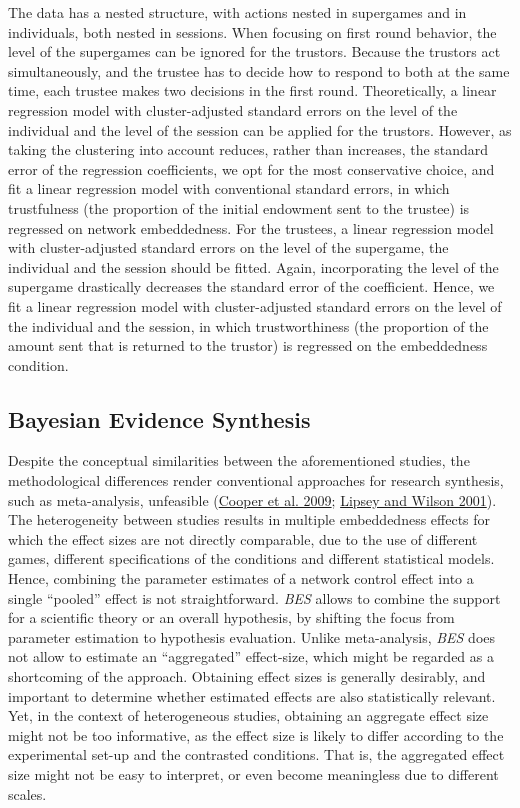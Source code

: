 \documentclass[
  11pt,
]{article}
\begin{document}
The data has a nested structure, with actions nested in supergames and in individuals, both nested in sessions.
When focusing on first round behavior, the level of the supergames can be ignored for the trustors.
Because the trustors act simultaneously, and the trustee has to decide how to respond to both at the same time, each trustee makes two decisions in the first round.
Theoretically, a linear regression model with cluster-adjusted standard errors on the level of the individual and the level of the session can be applied for the trustors.
However, as taking the clustering into account reduces, rather than increases, the standard error of the regression coefficients, we opt for the most conservative choice, and fit a linear regression model with conventional standard errors, in which trustfulness (the proportion of the initial endowment sent to the trustee) is regressed on network embeddedness.
For the trustees, a linear regression model with cluster-adjusted standard errors on the level of the supergame, the individual and the session should be fitted.
Again, incorporating the level of the supergame drastically decreases the standard error of the coefficient.
Hence, we fit a linear regression model with cluster-adjusted standard errors on the level of the individual and the session, in which trustworthiness (the proportion of the amount sent that is returned to the trustor) is regressed on the embeddedness condition.

\hypertarget{bayesian-evidence-synthesis}{%
\subsection{Bayesian Evidence Synthesis}\label{bayesian-evidence-synthesis}}

Despite the conceptual similarities between the aforementioned studies, the methodological differences render conventional approaches for research synthesis, such as meta-analysis, unfeasible (\protect\hyperlink{ref-cooper_handbook_2009}{Cooper et al. 2009}; \protect\hyperlink{ref-lipsey_wilson_2001}{Lipsey and Wilson 2001}).
The heterogeneity between studies results in multiple embeddedness effects for which the effect sizes are not directly comparable, due to the use of different games, different specifications of the conditions and different statistical models.
Hence, combining the parameter estimates of a network control effect into a single ``pooled'' effect is not straightforward.
\emph{BES} allows to combine the support for a scientific theory or an overall hypothesis, by shifting the focus from parameter estimation to hypothesis evaluation.
Unlike meta-analysis, \emph{BES} does not allow to estimate an ``aggregated'' effect-size, which might be regarded as a shortcoming of the approach.
Obtaining effect sizes is generally desirably, and important to determine whether estimated effects are also statistically relevant.
Yet, in the context of heterogeneous studies, obtaining an aggregate effect size might not be too informative, as the effect size is likely to differ according to the experimental set-up and the contrasted conditions.
That is, the aggregated effect size might not be easy to interpret, or even become meaningless due to different scales.
\end{document}
